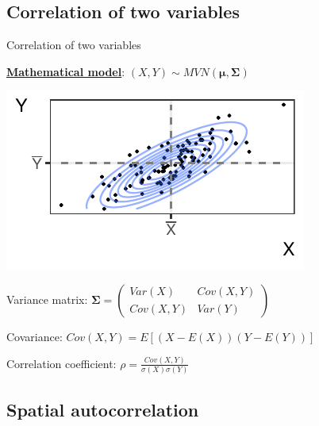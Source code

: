 \documentclass[
  ignorenonframetext,
]{beamer}
\begin{document}
\hypertarget{correlation-of-two-variables-1}{%
\subsection{Correlation of two
variables}\label{correlation-of-two-variables-1}}

\begin{frame}{Correlation of two variables}
\small

\href{https://distill.pub/2019/visual-exploration-gaussian-processes/}{\textbf{Mathematical
model}}: \((X,Y) \sim MVN(\boldsymbol\mu, \boldsymbol\Sigma)\)

\includegraphics{Lecture_1_files/figure-beamer/unnamed-chunk-3-1.pdf}

Variance matrix:
\(\boldsymbol\Sigma=\begin{pmatrix}Var(X) & Cov(X,Y)\\Cov(X,Y) & Var(Y)\end{pmatrix}\)

Covariance: \(Cov(X,Y)=E[(X-E(X))(Y-E(Y))]\)

Correlation coefficient: \(\rho = \frac{Cov(X,Y)}{\sigma(X)\sigma(Y)}\)
\end{frame}

\hypertarget{spatial-autocorrelation}{%
\subsection{Spatial autocorrelation}\label{spatial-autocorrelation}}
\end{document}
